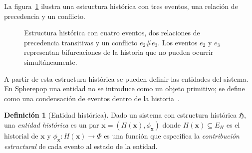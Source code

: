 \documentclass[12pt]{article}
\theoremstyle{plain}
\theoremstyle{definition}
\newtheorem{definition}[theorem]{Definición}
\begin{document}
La figura~\ref{fig:estructura_eventos} ilustra una estructura histórica con tres eventos, una relación de precedencia y un conflicto.

\begin{figure}[ht]
\centering
{}
\caption{Estructura histórica con cuatro eventos, dos relaciones de precedencia transitivas y un conflicto $e_2 \# e_3$. Los eventos $e_2$ y $e_3$ representan bifurcaciones de la historia que no pueden ocurrir simultáneamente.}
\label{fig:estructura_eventos}
\end{figure}

A partir de esta estructura histórica se pueden definir las entidades del sistema. En Spherepop una entidad no se introduce como un objeto primitivo; se define como una condensación de eventos dentro de la historia~\cite{whitehead,winskel}.

\begin{definition}[Entidad histórica]
\label{def:entidad}
Dado un sistema con estructura histórica $\mathfrak{H}$, una \emph{entidad histórica} es un par $\mathbf{x} = (H(\mathbf{x}), \phi_{\mathbf{x}})$ donde $H(\mathbf{x}) \subseteq E_H$ es el historial de $\mathbf{x}$ y $\phi_{\mathbf{x}}: H(\mathbf{x}) \to \Phi$ es una función que especifica la \emph{contribución estructural} de cada evento al estado de la entidad.
\end{definition}
\end{document}
